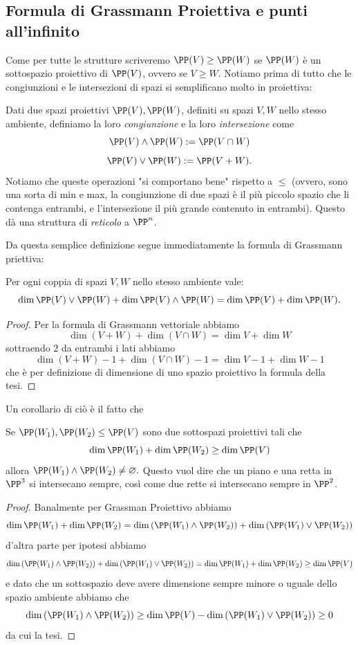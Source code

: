 \documentclass[11pt]{scrartcl}
\newcommand{\eset}{\varnothing}
\begin{document}
   	 \subsection{Formula di Grassmann Proiettiva e punti all'infinito}
   	 Come per tutte le strutture scriveremo $\PP(V)\ge \PP(W)$ se $\PP(W)$ è un sottospazio proiettivo di $\PP(V)$, ovvero se $V\ge W$. Notiamo prima di tutto che le congiunzioni e le intersezioni di spazi si semplificano molto in proiettiva:
   	 \begin{definition}
   	 	Dati due spazi proiettivi $\PP(V),\PP(W)$, definiti su spazi $V,W$ nello stesso ambiente, definiamo la loro \textit{congiunzione} e la loro \textit{intersezione} come
   	 	$$\PP(V)\land \PP(W):=\PP(V\cap W)$$
   	 	$$\PP(V)\lor \PP(W):=\PP(V+W).$$
   	 	Notiamo che queste operazioni "si comportano bene" rispetto a $\le$ (ovvero, sono una sorta di min e max, la congiunzione di due spazi è il più piccolo spazio che li contenga entrambi, e l'intersezione il più grande contenuto in entrambi). Questo dà una struttura di \textit{reticolo} a $\PP^n$.
   	 \end{definition}
   	 Da questa semplice definizione segue immediatamente la formula di Grassmann priettiva:
   	 \begin{theorem}
   	 	Per ogni coppia di spazi $V,W$ nello stesso ambiente vale:
   	 	$$\dim \PP(V)\lor \PP(W)+\dim \PP(V)\land \PP(W)=\dim \PP(V)+\dim\PP(W).$$
   	 \end{theorem}
   	 \begin{proof}
   	 	Per la formula di Grassmann vettoriale abbiamo
   	 	$$\dim(V+W)+\dim(V\cap W)=\dim V+\dim W$$
   	 	sottraendo $2$ da entrambi i lati abbiamo
   	 	$$\dim(V+W)-1+\dim(V\cap W)-1=\dim V-1+\dim W-1$$
   	 	che è per definizione di dimensione di uno spazio proiettivo la formula della tesi.
   	 \end{proof}
   	 Un corollario di ciò è il fatto che
   	 \begin{corollary}
   	 	Se $\PP(W_1),\PP(W_2)\le \PP(V)$ sono due sottospazi proiettivi tali che
   	 	$$\dim\PP(W_1)+\dim\PP(W_2)\ge \dim \PP(V)$$
   	 	allora $\PP(W_1)\land \PP(W_2)\ne \eset.$
   	 	Questo vuol dire che un piano e una retta in $\PP^3$ si intersecano sempre, così come due rette si intersecano sempre in $\PP^2$.
   	 \end{corollary}
   	 \begin{proof}
   	 	Banalmente per Grassman Proiettivo abbiamo 
   	 	$$\dim \PP(W_1)+\dim\PP(W_2)=\dim\left(\PP(W_1)\land\PP(W_2)\right)+\dim\left(\PP(W_1)\lor \PP(W_2)\right)$$
   	 	d'altra parte per ipotesi abbiamo
   	 	$$\dim\left(\PP(W_1)\land\PP(W_2)\right)+\dim\left(\PP(W_1)\lor \PP(W_2)\right)=\dim\PP(W_1)+\dim\PP(W_2)\ge \dim \PP(V)$$
   	 	e dato che un sottospazio deve avere dimensione sempre minore o uguale dello spazio ambiente abbiamo che
   	 	$$\dim\left(\PP(W_1)\land\PP(W_2)\right)\ge \dim \PP(V)-\dim\left(\PP(W_1)\lor \PP(W_2)\right)\ge 0$$
   	 	da cui la tesi.
   	 \end{proof}
\end{document}
